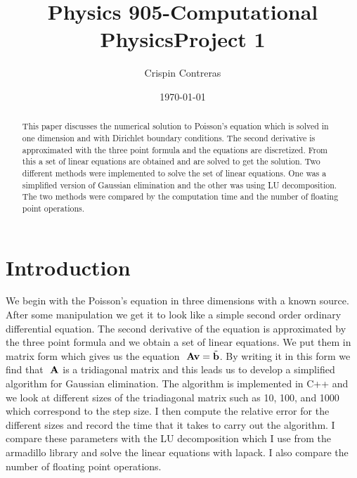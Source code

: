 \documentclass[11pt,a4wide]{article}
\begin{document}
\title{Physics 905-Computational Physics\break Project 1}
\author{Crispin Contreras}
\date{\today}
\maketitle


\begin{abstract}
This paper discusses the numerical solution to Poisson's equation which is solved in
one dimension and with Dirichlet boundary conditions. The second derivative
is approximated with the three point formula and the equations are discretized.
From this a set of linear equations are obtained and are solved to get the solution.
Two different methods were implemented to solve the set of linear equations. One was a simplified version of Gaussian elimination and the other was using LU decomposition. The two methods were compared by the computation time and the number of floating point operations.
\end{abstract}



\section{Introduction}
We begin with the Poisson's equation in three dimensions  with a known source. After some manipulation we get it to look like a simple second order ordinary differential equation. The second derivative of the equation is approximated by the three point formula and we obtain a set of linear equations. We put them in matrix form which gives us the equation  $\ {\bf A}{\bf v} = \tilde{{\bf b}}$. By writing it in this form we find that $\ {\bf A}$ is a tridiagonal matrix and this leads us to develop a simplified algorithm for Gaussian elimination. The algorithm is implemented in C++ and we look at different sizes of the triadiagonal matrix such as 10, 100, and 1000 which correspond to the step size. I then  compute the relative error for the different sizes and record the time that it takes to carry out the algorithm. I compare these parameters with the LU decomposition which I use from the armadillo library and solve the linear equations with lapack. I also compare the number of floating point operations.
\end{document}
